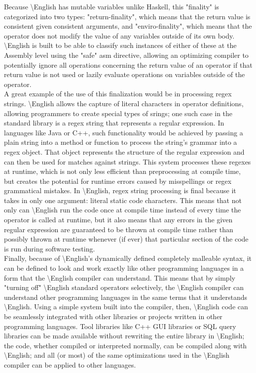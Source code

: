\documentclass{article}
\newcommand{\name}{\textbackslash{}English}
\begin{document}
\indent Because \name{} has mutable variables unlike Haskell, this "finality" is categorized into two types: "return-finality", which means that the return value is consistent given consistent arguments, and "enviro-finality", which means that the operator does not modify the value of any variables outside of its own body. \name{} is built to be able to classify such instances of either of these at the Assembly level using the "safe" asm directive, allowing an optimizing compiler to potentially ignore all operations concerning the return value of an operator if that return value is not used or lazily evaluate operations on variables outside of the operator.\\
\indent A great example of the use of this finalization would be in processing regex strings. \name{} allows the capture of literal characters in operator definitions, allowing programmers to create special types of srings; one such case in the standard library is a regex string that represents a regular expression. In languages like Java or C++, such functionality would be achieved by passing a plain string into a method or function to process the string's grammar into a regex object. That object represents the structure of the regular expression and can then be used for matches against strings. This system processes these regexes at runtime, which is not only less efficient than preprocessing at compile time, but creates the potential for runtime errors caused by misspellings or regex grammatical mistakes. In \name{}, regex string processing is final because it takes in only one argument: literal static code characters. This means that not only can \name{} run the code once at compile time instead of every time the operator is called at runtime, but it also means that any errors in the given regular expression are guaranteed to be thrown at compile time rather than possibly thrown at runtime whenever (if ever) that particular section of the code is run during software testing.\\
\indent Finally, because of \name{}'s dynamically defined completely malleable syntax, it can be defined to look and work exactly like other programming languages in a form that the \name{} compiler can understand. This means that by simply "turning off" \name{} standard operators selectively, the \name{} compiler can understand other programming languages in the same terms that it understands \name{}. Using a simple system built into the compiler, then, \name{} code can be seamlessly integrated with other libraries or projects written in other programming languages. Tool libraries like C++ GUI libraries or SQL query libraries can be made available without rewriting the entire library in \name{}; the code, whether compiled or interpreted normally, can be compiled along with \name{}; and all (or most) of the same optimizations used in the \name{} compiler can be applied to other languages.\\
\end{document}
